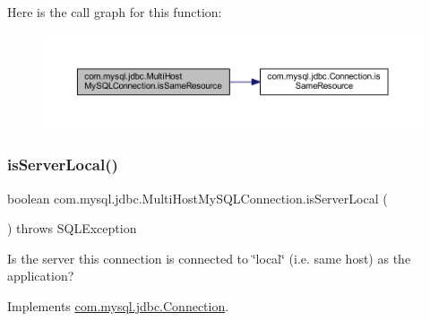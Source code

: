 Here is the call graph for this function\+:
\nopagebreak
\begin{figure}[H]
\begin{center}
\leavevmode
\includegraphics[width=350pt]{classcom_1_1mysql_1_1jdbc_1_1_multi_host_my_s_q_l_connection_a476b5999b12b909b4b43cd3c97b4f5d5_cgraph}
\end{center}
\end{figure}
\mbox{\label{classcom_1_1mysql_1_1jdbc_1_1_multi_host_my_s_q_l_connection_a044d7bf7d1701e6102dfd2d0c88be318}} 
\subsubsection{\texorpdfstring{is\+Server\+Local()}{isServerLocal()}}
{\footnotesize\ttfamily boolean com.\+mysql.\+jdbc.\+Multi\+Host\+My\+S\+Q\+L\+Connection.\+is\+Server\+Local (\begin{DoxyParamCaption}{ }\end{DoxyParamCaption}) throws S\+Q\+L\+Exception}

Is the server this connection is connected to \char`\"{}local\char`\"{} (i.\+e. same host) as the application? 

Implements \mbox{\hyperlink{interfacecom_1_1mysql_1_1jdbc_1_1_connection_a37eb25137505b9aaf4b25a847f87e949}{com.\+mysql.\+jdbc.\+Connection}}.

